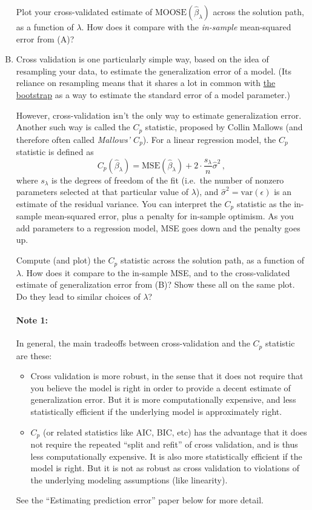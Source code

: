 \documentclass{mynotes}
\begin{document}
\begin{enumerate}[(A)]
Plot your cross-validated estimate of $\mathrm{MOOSE}(\hat{\beta}_{\lambda})$ across the solution path, as a function of $\lambda$.  How does it compare with the \textit{in-sample} mean-squared error from (A)?

\item Cross validation is one particularly simple way, based on the idea of resampling your data, to estimate the generalization error of a model.  (Its reliance on resampling means that it shares a lot in common with \href{https://en.wikipedia.org/wiki/Bootstrapping_(statistics)}{the bootstrap} as a way to estimate the standard error of a model parameter.)

However, cross-validation isn't the only way to estimate generalization error.  Another such way is called the $C_p$ statistic, proposed by Collin Mallows (and therefore often called \textit{Mallows' $C_p$}).  For a linear regression model, the $C_p$ statistic is defined as
$$
C_p(\hat{\beta}_\lambda) = \mathrm{MSE}(\hat \beta_{\lambda}) + 2 \cdot \frac{s_{\lambda}}{n} \hat \sigma^2 \, ,
$$
where $s_{\lambda}$ is the degrees of freedom of the fit (i.e.~the number of nonzero parameters selected at that particular value of $\lambda$), and $\hat \sigma^2 = \mathrm{var}(\epsilon)$ is an estimate of the residual variance.  You can interpret the $C_p$ statistic as the in-sample mean-squared error, plus a penalty for in-sample optimism.  As you add parameters to a regression model, MSE goes down and the penalty goes up. 

Compute (and plot) the $C_p$ statistic across the solution path, as a function of $\lambda$.  How does it compare to the in-sample MSE, and to the cross-validated estimate of generalization error from (B)?  Show these all on the same plot.  Do they lead to similar choices of $\lambda$?

\paragraph{Note 1:} In general, the main tradeoffs between cross-validation and the $C_p$ statistic are these:
\begin{itemize}
\item  Cross validation is more robust, in the sense that it does not require that you believe the model is right in order to provide a decent estimate of generalization error.  But it is more computationally expensive, and less statistically efficient if the underlying model is approximately right.
\item $C_p$ (or related statistics like AIC, BIC, etc) has the advantage that it does not require the repeated ``split and refit'' of cross validation, and is thus less computationally expensive.  It is also more statistically efficient if the model is right.  But it is not as robust as cross validation to violations of the underlying modeling assumptions (like linearity).
\end{itemize}
See the ``Estimating prediction error'' paper below for more detail.


\end{enumerate}
\end{document}

